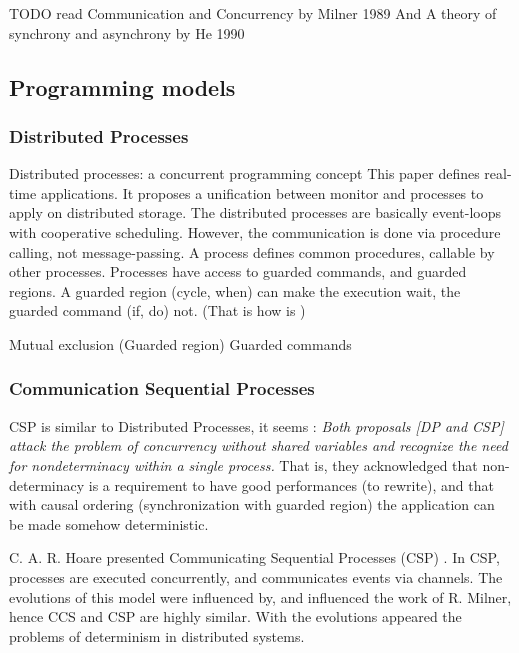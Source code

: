 TODO read Communication and Concurrency by Milner 1989
And A theory of synchrony and asynchrony by He 1990



\subsection{Programming models}

\subsubsection{Distributed Processes}

Distributed processes: a concurrent programming concept \cite{Hansen1978}
This paper defines real-time applications.
It proposes a unification between monitor and processes to apply on distributed storage.
The distributed processes are basically event-loops with cooperative scheduling.
However, the communication is done via procedure calling, not message-passing.
A process defines common procedures, callable by other processes.
Processes have access to guarded commands, and guarded regions.
A guarded region (cycle, when) can make the execution wait, the guarded command (if, do) not.
(That is how is )

Mutual exclusion (Guarded region) \cite{Hansen1978a} \cite{Hoare2002}
Guarded commands \cite{Dijkstra1975}

\subsubsection{Communication Sequential Processes}

CSP is similar to Distributed Processes, it seems :
\textit{Both proposals [DP and CSP] attack the problem of concurrency without shared variables and recognize the need for nondeterminacy within a single process.}
That is, they acknowledged that non-determinacy is a requirement to have good performances (to rewrite), and that with causal ordering (synchronization with guarded region) the application can be made somehow deterministic.

C. A. R. Hoare presented Communicating Sequential Processes (CSP) \cite{Hoare1978, Brookes1984}.
In CSP, processes are executed concurrently, and communicates events via channels.
The evolutions of this model were influenced by, and influenced the work of R. Milner, hence CCS and CSP are highly similar.
With the evolutions appeared the problems of determinism in distributed systems.\cite{Brookes1984}






